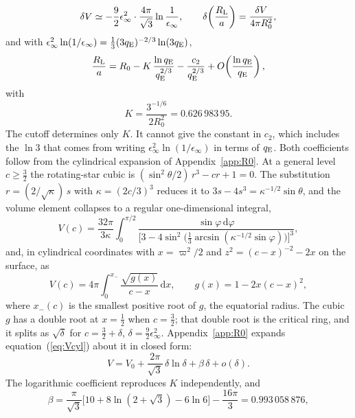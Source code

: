 \documentclass[twocolumn]{aastex702}
\newcommand{\qE}{q_{\rm E}}
\newcommand{\RL}{R_{\rm L}}
\newcommand{\dd}{\mathrm{d}}
\begin{document}
\begin{equation}
\delta V\simeq-\frac92\epsilon_\infty^2\cdot\frac{4\pi}{\sqrt3}\ln\frac1{\epsilon_\infty},
\qquad
\delta\!\left(\frac{\RL}{a}\right)=\frac{\delta V}{4\pi R_0^2},
\end{equation}
and with $\epsilon_\infty^2\ln(1/\epsilon_\infty)=\tfrac13(3\qE)^{-2/3}\ln(3\qE)$,
\begin{equation}
\frac{\RL}{a}=R_0-K\,\frac{\ln\qE}{\qE^{2/3}}-\frac{c_2}{\qE^{2/3}}+O\!\left(\frac{\ln\qE}{\qE}\right),
\label{eq:logexp}
\end{equation}
with
\begin{equation}
K=\frac{3^{-1/6}}{2R_0^2}=0.626\,983\,95 .
\label{eq:K}
\end{equation}
The cutoff determines only $K$. It cannot give the constant in $c_2$, which includes the $\ln3$ that comes from writing $\epsilon_\infty^2\ln(1/\epsilon_\infty)$ in terms of $\qE$. Both coefficients follow from the cylindrical expansion of Appendix~\ref{app:R0}. At a general level $c\ge\tfrac32$ the rotating-star cubic is $(\sin^2\theta/2)\,r^3-cr+1=0$. The substitution $r=(2/\sqrt\kappa)\,s$ with $\kappa=(2c/3)^3$ reduces it to $3s-4s^3=\kappa^{-1/2}\sin\theta$, and the volume element collapses to a regular one-dimensional integral,
\begin{equation}
V(c)=\frac{32\pi}{3\kappa}\int_0^{\pi/2}\frac{\sin\varphi\,\dd\varphi}{\big[3-4\sin^2\!\big(\tfrac13\arcsin(\kappa^{-1/2}\sin\varphi)\big)\big]^3},
\label{eq:Vc}
\end{equation}
and, in cylindrical coordinates with $x=\varpi^2/2$ and $z^2=(c-x)^{-2}-2x$ on the surface, as
\begin{equation}
V(c)=4\pi\int_0^{x_-}\frac{\sqrt{g(x)}}{c-x}\,\dd x,\qquad g(x)=1-2x(c-x)^2,
\label{eq:Vcyl}
\end{equation}
where $x_-(c)$ is the smallest positive root of $g$, the equatorial radius. The cubic $g$ has a double root at $x=\tfrac12$ when $c=\tfrac32$; that double root is the critical ring, and it splits as $\sqrt\delta$ for $c=\tfrac32+\delta$, $\delta=\tfrac92\epsilon_\infty^2$. Appendix~\ref{app:R0} expands equation~(\ref{eq:Vcyl}) about it in closed form:
\begin{equation}
V=V_0+\frac{2\pi}{\sqrt3}\,\delta\ln\delta+\beta\,\delta+o(\delta).
\end{equation}
The logarithmic coefficient reproduces $K$ independently, and
\begin{equation}
\beta=\frac{\pi}{\sqrt3}\Big[10+8\ln(2+\sqrt3)-6\ln6\Big]-\frac{16\pi}{3}=0.993\,058\,876,
\label{eq:beta}
\end{equation}
\end{document}
